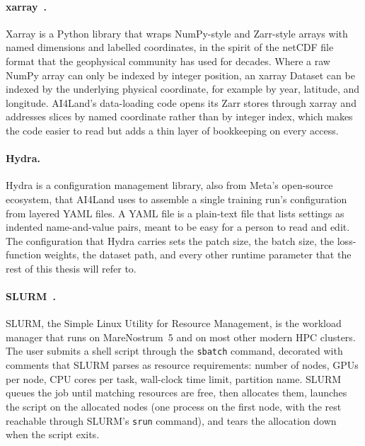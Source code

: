\documentclass[12pt,a4paper]{article}
\begin{document}
\paragraph{xarray~\cite{xarray}.} Xarray is a Python library that wraps NumPy-style and
Zarr-style arrays with named dimensions and labelled coordinates, in the spirit of the
netCDF file format that the geophysical community has used for decades. Where a raw NumPy
array can only be indexed by integer position, an xarray Dataset can be indexed by the
underlying physical coordinate, for example by year, latitude, and longitude. AI4Land's
data-loading code opens its Zarr stores through xarray and addresses slices by named
coordinate rather than by integer index, which makes the code easier to read but adds a
thin layer of bookkeeping on every access.

\paragraph{Hydra.} Hydra is a configuration management library, also from Meta's
open-source ecosystem, that AI4Land uses to assemble a single training run's configuration
from layered YAML files. A YAML file is a plain-text file that lists settings as indented
name-and-value pairs, meant to be easy for a person to read and edit. The configuration that
Hydra carries sets the patch size, the
batch size, the loss-function weights, the dataset path, and every other runtime parameter
that the rest of this thesis will refer to.

\paragraph{SLURM~\cite{slurm}.} SLURM, the Simple Linux Utility for Resource Management, is
the workload manager that runs on MareNostrum~5 and on most other modern HPC clusters. The
user submits a shell script through the \texttt{sbatch} command, decorated with comments that
SLURM parses as resource requirements: number of nodes, GPUs per node, CPU cores per task,
wall-clock time limit, partition name. SLURM queues the job until matching resources are
free, then allocates them, launches the script on the allocated nodes (one process on the
first node, with the rest reachable through SLURM's \texttt{srun} command), and tears the
allocation down when the script exits.
\end{document}
